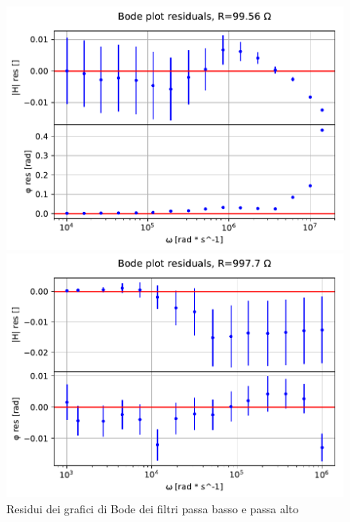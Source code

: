 \documentclass{article}
\begin{document}
\begin{figure}[h]
\begin{minipage}{0.5\textwidth}
        \includegraphics[width=\textwidth]{bodeplot_res3.pdf} 
    \end{minipage}\hfill
    \begin{minipage}{0.5\textwidth}
        \centering
        \includegraphics[width=\textwidth]{bodeplot_res4.pdf} 
    \end{minipage}
    \caption{Residui dei grafici di Bode dei filtri passa basso e passa alto}
    \label{fig:RC_fil_res}
\end{figure}
\end{document}
